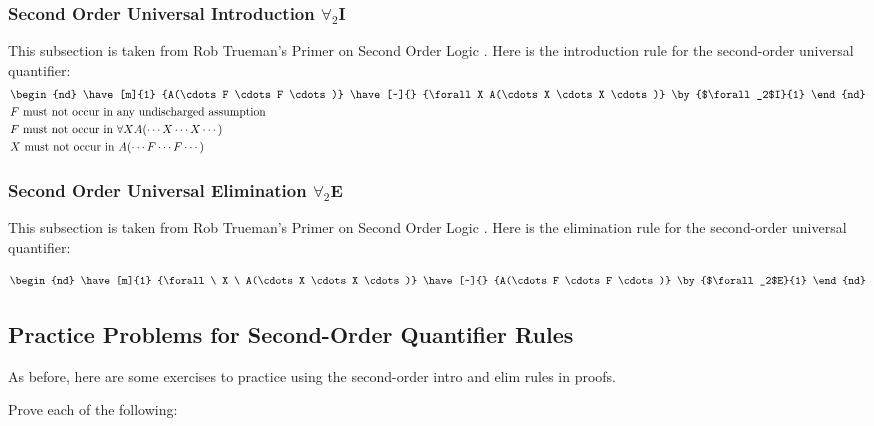 \subsubsection{Second Order Universal Introduction $\forall_2$I}
This subsection is taken from Rob Trueman's Primer on Second Order Logic \cite{truemanSOL}. Here is the introduction rule for the second-order universal quantifier:
\begin{align}
    &\begin{nd}
        \have[m]{1} {A(\cdots F \cdots F \cdots)} 
        \have[~]{} {\forall X A(\cdots X \cdots X \cdots)} \by{$\forall_2$I}{1} 
    \end{nd}\nonumber \\
    &F \text{ must not occur in any undischarged assumption} \nonumber \\
    &F \text{ must not occur in }\forall X A(\cdots X \cdots X \cdots) \nonumber \\
    &X \text{ must not occur in }A(\cdots F \cdots F \cdots) \nonumber
\end{align} 
\subsubsection{Second Order Universal Elimination $\forall_2$E}
This subsection is taken from Rob Trueman's Primer on Second Order Logic \cite{truemanSOL}.  Here is the elimination rule for the second-order universal quantifier:

\begin{equation}
    \begin{nd}
        \have[m]{1} {\forall \ X \ A(\cdots X \cdots X \cdots)}
        \have[~]{} {A(\cdots F \cdots F \cdots)} \by{$\forall_2$E}{1}
    \end{nd}\nonumber
\end{equation}

\subsection{ Practice Problems for Second-Order Quantifier Rules}
\label{subsec:SOLQuantifierExercises}
As before, here are some exercises to practice using the second-order intro and elim rules in proofs.  \\ \steezybreak

\noindent Prove each of the following:  

